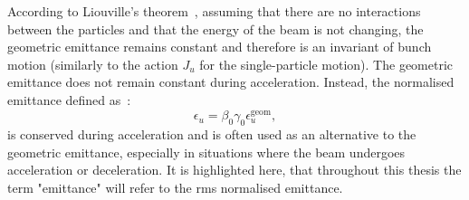  
 
 According to Liouville’s theorem~\cite{wolski2014}, assuming that there are no interactions between the particles and that the energy of the beam is not changing, the geometric emittance remains constant and therefore is an invariant of bunch motion (similarly to the action $J_u$ for the single-particle motion). The geometric emittance does not remain constant during acceleration. Instead, the normalised emittance defined as~\cite{wolski2014}:
 \begin{equation}\label{eq:normalised_emittance}
     \epsilon_u = \beta_0 \gamma_0 \epsilon^{\mathrm{geom}}_u,
 \end{equation}
is conserved during acceleration and is often used as an alternative to the geometric emittance, especially in situations where the beam undergoes acceleration or deceleration. It is highlighted here, that throughout this thesis the term "emittance" will refer to the rms normalised emittance.
 
 
 
